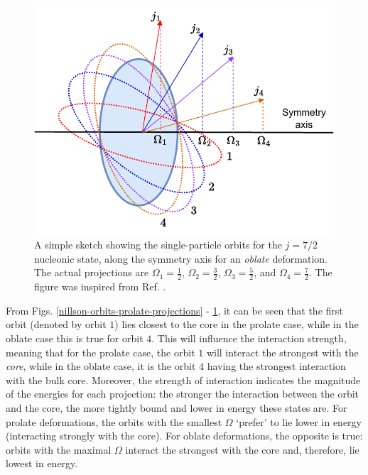 \begin{figure}
    \centering
    \includegraphics[scale=1]{Chapters/Figures/nillson_SP_orbits_2.pdf}
    \caption{A simple sketch showing the single-particle orbits for the $j=7/2$ nucleonic state, along the symmetry axis for an \emph{oblate} deformation. The actual projections are $\Omega_1=\frac{1}{2}$, $\Omega_2=\frac{3}{2}$, $\Omega_3=\frac{5}{2}$, and $\Omega_4=\frac{7}{2}$. The figure was inspired from Ref. \cite{krane1991introductory}.}
    \label{nillson-orbits-oblate-projections}
\end{figure}

From Figs. \ref{nillson-orbits-prolate-projections} - \ref{nillson-orbits-oblate-projections}, it can be seen that the first orbit (denoted by orbit $1$) lies closest to the core in the prolate case, while in the oblate case this is true for orbit $4$. This will influence the interaction strength, meaning that for the prolate case, the orbit $1$ will interact the strongest with the \emph{core}, while in the oblate case, it is the orbit $4$ having the strongest interaction with the bulk core. Moreover, the strength of interaction indicates the magnitude of the energies for each projection: the stronger the interaction between the orbit and the core, the more tightly bound and lower in energy these states are. For prolate deformations, the orbits with the smallest $\Omega$ `prefer' to lie lower in energy (interacting strongly with the core). For oblate deformations, the opposite is true: orbits with the maximal $\Omega$ interact the strongest with the core and, therefore, lie lowest in energy.

